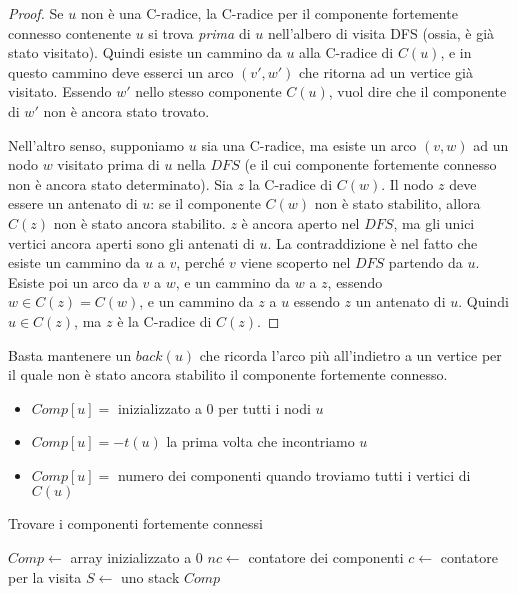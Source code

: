 \begin{proof}
Se $u$ non \`e una C-radice, la C-radice per il componente fortemente connesso contenente $u$ si trova \emph{prima} di $u$ nell'albero di visita DFS (ossia, \`e gi\`a stato visitato). Quindi esiste un cammino da $u$ alla C-radice di $C(u)$, e in questo cammino deve esserci un arco $(v',w')$ che ritorna ad un vertice gi\`a visitato. Essendo $w'$ nello stesso componente $C(u)$, vuol dire che il componente di $w'$ non \`e ancora stato trovato.

Nell'altro senso, supponiamo $u$ sia una C-radice, ma esiste un arco $(v,w)$ ad un nodo $w$ visitato prima di $u$ nella $DFS$ (e il cui componente fortemente connesso non \`e ancora stato determinato). Sia $z$ la C-radice di $C(w)$. Il nodo $z$ deve essere un antenato di $u$: se il componente $C(w)$ non \`e stato stabilito, allora $C(z)$ non \`e stato ancora stabilito. $z$ \`e ancora aperto nel $DFS$, ma gli unici vertici ancora aperti sono gli antenati di $u$. La contraddizione \`e nel fatto che esiste un cammino da $u$ a $v$, perch\'e $v$ viene scoperto nel $DFS$ partendo da $u$. Esiste poi un arco da $v$ a $w$, e un cammino da $w$ a $z$, essendo $w \in C(z) = C(w)$, e un cammino da $z$ a $u$ essendo $z$ un antenato di $u$. Quindi $u \in C(z)$, ma $z$ \`e la C-radice di $C(z)$.
\end{proof}

Basta mantenere un $back(u)$ che ricorda l'arco pi\`u all'indietro a un vertice per il quale non \`e stato ancora stabilito il componente fortemente connesso.

\begin{itemize}
    \item $Comp[u] =$ inizializzato a 0 per tutti i nodi $u$
    \item $Comp[u] = - t(u)$ la prima volta che incontriamo $u$
    \item $Comp[u] =$ numero dei componenti quando troviamo tutti i vertici di $C(u)$
\end{itemize}

\begin{algorithm}
\caption{Trovare i componenti fortemente connessi}
\begin{algorithmic}[1]
    \State $Comp \gets$ array inizializzato a 0
    \State $nc \gets$ contatore dei componenti
    \State $c \gets$ contatore per la visita
    \State $S \gets$ uno stack
            \State {}
        \EndIf
    \EndFor
    \State \Return $Comp$
\EndFunction
\end{algorithmic}
\end{algorithm}

